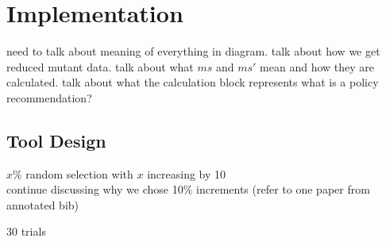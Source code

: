 \section{Implementation}

need to talk about meaning of everything in diagram.
talk about how we get reduced mutant data.
talk about what $ms$ and $ms'$ mean and how they are calculated.
talk about what the calculation block represents
what is a policy recommendation?

\subsection{Tool Design}

$x\%$ random selection with $x$ increasing by 10 \\

continue discussing why we chose 10\% increments (refer to one paper from annotated bib)

30 trials


